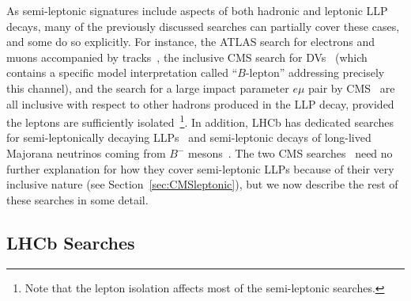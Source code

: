 {As semi-leptonic signatures include aspects of both hadronic and leptonic LLP decays, many of the previously discussed searches can partially cover these cases, and some do so explicitly. For instance, the ATLAS search for electrons and muons accompanied by tracks~\cite{Aad:2015rba}, the inclusive CMS search for DVs~\cite{CMS:2017oor} (which contains a specific model interpretation called ``$B$-lepton'' addressing precisely this channel), and the search for a large impact parameter $e\mu$ pair by CMS~\cite{CMS-PAS-EXO-16-022} are all inclusive with respect to other hadrons produced in the LLP decay, provided the leptons are sufficiently isolated~\footnote{Note that the lepton isolation affects most of the semi-leptonic searches.}. In addition, LHCb has dedicated searches for semi-leptonically decaying LLPs~\cite{Aaij:2016xmb} and semi-leptonic decays of long-lived Majorana neutrinos coming from $B^{-}$ mesons~\cite{Aaij:2014aba}. The two CMS searches~\cite{CMS:2017oor,CMS-PAS-EXO-16-022} need no further explanation for how they cover semi-leptonic LLPs because of their very inclusive nature (see Section~\ref{sec:CMSleptonic}), but we now describe the rest of these searches in some detail.

\subsection{LHCb Searches}

}
